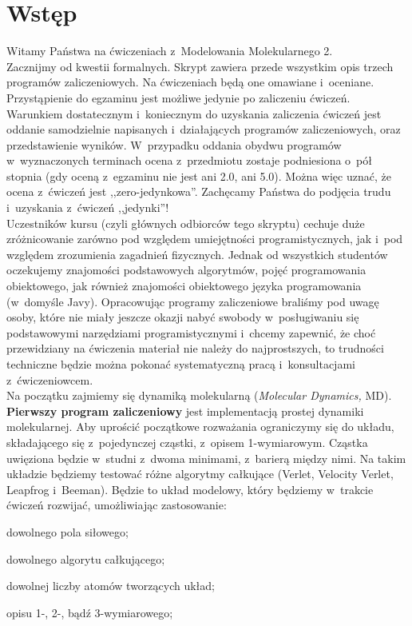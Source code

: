 \documentclass[a4paper,11pt,twoside]{book}
\newenvironment{packed_enum}{
\begin{enumerate}
  \setlength{\itemsep}{1pt}
  \setlength{\parskip}{0pt}
  \setlength{\parsep}{0pt}
}{\end{enumerate}}
\begin{document}



\chapter{Wstęp}
\pagestyle{headings} %
Witamy Państwa na ćwiczeniach z~Modelowania Molekularnego 2.\\

Zacznijmy od kwestii formalnych. Skrypt zawiera przede wszystkim opis trzech programów zaliczeniowych. Na ćwiczeniach będą one omawiane i~oceniane. Przystąpienie do egzaminu jest możliwe jedynie po zaliczeniu ćwiczeń. Warunkiem dostatecznym i~koniecznym do uzyskania zaliczenia ćwiczeń jest oddanie samodzielnie napisanych i~działających programów zaliczeniowych, oraz przedstawienie wyników. W~przypadku oddania obydwu programów w~wyznaczonych terminach ocena z~przedmiotu zostaje podniesiona o~pół stopnia (gdy oceną z~egzaminu nie jest ani 2.0, ani 5.0). Można więc uznać, że ocena z~ćwiczeń jest ,,zero-jedynkowa''. Zachęcamy Państwa do podjęcia trudu i~uzyskania z~ćwiczeń ,,jedynki''!\\

Uczestników kursu (czyli głównych odbiorców tego skryptu) cechuje duże zróżnicowanie zarówno pod względem umiejętności programistycznych, jak i~pod względem zrozumienia zagadnień fizycznych. Jednak od wszystkich studentów oczekujemy znajomości podstawowych algorytmów, pojęć programowania obiektowego, jak również znajomości obiektowego języka programowania (w~domyśle Javy). Opracowując programy zaliczeniowe braliśmy pod uwagę osoby, które nie miały jeszcze okazji nabyć swobody w~posługiwaniu się podstawowymi narzędziami programistycznymi i~chcemy zapewnić, że choć przewidziany na ćwiczenia materiał nie należy do najprostszych, to trudności techniczne będzie można pokonać systematyczną pracą i~konsultacjami z~ćwiczeniowcem. \\

Na początku zajmiemy się dynamiką molekularną (\emph{Molecular Dynamics,} MD). {\bf Pierwszy program zaliczeniowy} jest implementacją prostej dynamiki molekularnej. Aby uprościć początkowe rozważania ograniczymy się do układu, składającego się z~pojedynczej cząstki, z~opisem 1-wymiarowym. Cząstka uwięziona będzie w~studni z~dwoma minimami, z~barierą między nimi. Na takim układzie będziemy testować różne algorytmy całkujące (Verlet, Velocity Verlet, Leapfrog i~Beeman). Będzie to układ modelowy, który będziemy w~trakcie ćwiczeń rozwijać, umożliwiając zastosowanie:
\begin{packed_enum}
\item dowolnego pola siłowego;
\item dowolnego algorytu całkującego;
\item dowolnej liczby atomów tworzących układ;
\item opisu 1-, 2-, bądź 3-wymiarowego;
\end{packed_enum}
\end{document}
